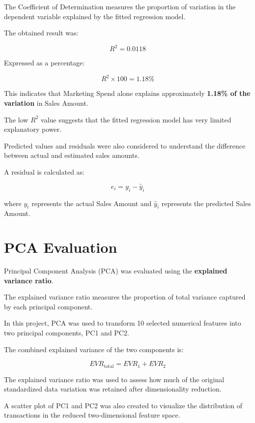 \documentclass[12pt,a4paper]{report}
\begin{document}
The Coefficient of Determination
measures the proportion of variation
in the dependent variable explained
by the fitted regression model.

The obtained result was:

\[
R^2 = 0.0118
\]

Expressed as a percentage:

\[
R^2 \times 100 = 1.18\%
\]

This indicates that Marketing Spend
alone explains approximately
\textbf{1.18\% of the variation}
in Sales Amount.

The low $R^2$ value suggests
that the fitted regression model
has very limited explanatory power.

Predicted values and residuals
were also considered to understand
the difference between actual
and estimated sales amounts.

A residual is calculated as:

\[
e_i = y_i - \hat{y}_i
\]

where $y_i$ represents the actual
Sales Amount and $\hat{y}_i$
represents the predicted Sales Amount.


\section{PCA Evaluation}

Principal Component Analysis (PCA)
was evaluated using the
\textbf{explained variance ratio}.

The explained variance ratio measures
the proportion of total variance
captured by each principal component.

In this project, PCA was used
to transform 10 selected numerical
features into two principal
components, PC1 and PC2.

The combined explained variance
of the two components is:

\[
EVR_{\text{total}} = EVR_1 + EVR_2
\]

The explained variance ratio
was used to assess how much
of the original standardized
data variation was retained
after dimensionality reduction.

A scatter plot of PC1 and PC2
was also created to visualize
the distribution of transactions
in the reduced two-dimensional
feature space.

\end{document}
